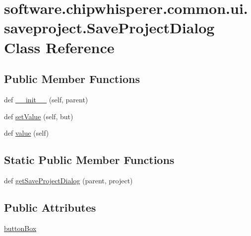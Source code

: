 \hypertarget{classsoftware_1_1chipwhisperer_1_1common_1_1ui_1_1saveproject_1_1SaveProjectDialog}{}\section{software.\+chipwhisperer.\+common.\+ui.\+saveproject.\+Save\+Project\+Dialog Class Reference}
\label{classsoftware_1_1chipwhisperer_1_1common_1_1ui_1_1saveproject_1_1SaveProjectDialog}
\subsection*{Public Member Functions}
\begin{DoxyCompactItemize}
\item 
def \hyperlink{classsoftware_1_1chipwhisperer_1_1common_1_1ui_1_1saveproject_1_1SaveProjectDialog_a74ed4268ea7f95d176a10f7ecf35b11a}{\+\_\+\+\_\+init\+\_\+\+\_\+} (self, parent)
\item 
def \hyperlink{classsoftware_1_1chipwhisperer_1_1common_1_1ui_1_1saveproject_1_1SaveProjectDialog_ac8d30703920421b5084bdd8212751a4b}{set\+Value} (self, but)
\item 
def \hyperlink{classsoftware_1_1chipwhisperer_1_1common_1_1ui_1_1saveproject_1_1SaveProjectDialog_a75a3d47b45e46cfb75dec8018bc28db8}{value} (self)
\end{DoxyCompactItemize}
\subsection*{Static Public Member Functions}
\begin{DoxyCompactItemize}
\item 
def \hyperlink{classsoftware_1_1chipwhisperer_1_1common_1_1ui_1_1saveproject_1_1SaveProjectDialog_a116a2d66274ec2e80c142f8290d48610}{get\+Save\+Project\+Dialog} (parent, project)
\end{DoxyCompactItemize}
\subsection*{Public Attributes}
\begin{DoxyCompactItemize}
\item 
\hyperlink{classsoftware_1_1chipwhisperer_1_1common_1_1ui_1_1saveproject_1_1SaveProjectDialog_ac079729687f3f5327de93bf1585de65c}{button\+Box}
\end{DoxyCompactItemize}


